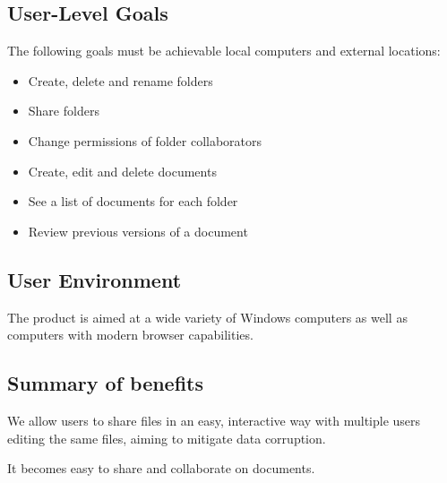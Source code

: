 \subsection{User-Level Goals}

The following goals must be achievable local computers and external locations:
\begin{itemize}
    \item Create, delete and rename folders
    \item Share folders
    \item Change permissions of folder collaborators
    \item Create, edit and delete documents
    \item See a list of documents for each folder
    \item Review previous versions of a document
\end{itemize}

\subsection{User Environment}
The product is aimed at a wide variety of Windows computers as well as computers with modern browser capabilities.

\subsection{Summary of benefits}
We allow users to share files in an easy, interactive way with multiple users editing the same files, aiming to mitigate data corruption.

It becomes easy to share and collaborate on documents.